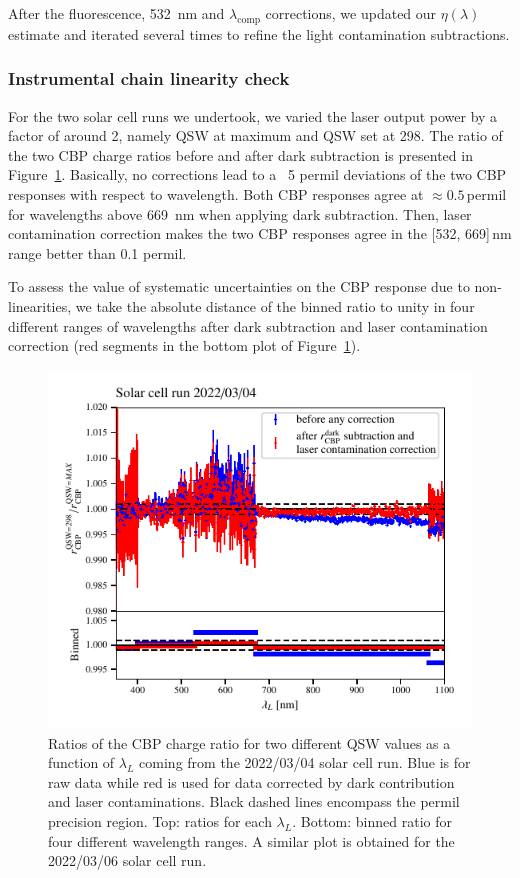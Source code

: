 After the fluorescence, \SI{532}{\nano\meter} and $\lambda_{\mathrm{comp}}$ corrections, we updated our $\eta(\lambda)$ estimate and iterated several times to refine the light contamination subtractions.


\subsubsection{Instrumental chain linearity check}\label{sec:sc_linearity}
For the two solar cell runs we undertook, we varied the laser output power by a factor of around 2, namely QSW at maximum and QSW set at 298. The ratio of the two CBP charge ratios before and after dark subtraction is presented in Figure~\ref{fig:SCqswlinearity}. Basically, no corrections lead to a ~5 permil deviations of the two CBP responses with respect to wavelength. Both CBP responses agree at $\approx 0.5\,$permil for wavelengths above \SI{669}{\nano\meter} when applying dark subtraction. Then, laser contamination correction makes the two CBP responses agree in the [532, 669]\,nm range better than 0.1 permil.

To assess the value of systematic uncertainties on the CBP response due to non-linearities, we take the absolute distance of the binned ratio to unity in four different ranges of wavelengths after dark subtraction and laser contamination correction (red segments in the bottom plot of Figure~\ref{fig:SCqswlinearity}).

\begin{figure}[h]
    \centering
    \includegraphics[width=\columnwidth]{fig/sc_qsw_ratios.pdf}
    \caption{Ratios of the CBP charge ratio for two different QSW values as a function of $\lambda_L$ coming from the 2022/03/04 solar cell run. Blue is for raw data while red is used for data corrected by dark contribution and laser contaminations. Black dashed lines encompass the permil precision region. Top: ratios for each $\lambda_L$. Bottom: binned ratio for four different wavelength ranges. A similar plot is obtained for the 2022/03/06 solar cell run.}
    \label{fig:SCqswlinearity}    
\end{figure}


